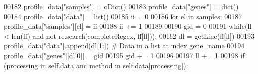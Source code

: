 \begin{DoxyCode}
00182                 profile\_data[\textcolor{stringliteral}{"samples"}] = oDict()
00183                 profile\_data[\textcolor{stringliteral}{"genes"}] = dict()
00184                 profile\_data[\textcolor{stringliteral}{"data"}] = list()
00185                 ii = 0
00186                 \textcolor{keywordflow}{for} el \textcolor{keywordflow}{in} samples:
00187                     profile\_data[\textcolor{stringliteral}{"samples"}][el] = ii
00188                     ii += 1
00189 
00190                 gid = 0
00191                 \textcolor{keywordflow}{while}(ll < len(ff) \textcolor{keywordflow}{and} \textcolor{keywordflow}{not} re.search(completeRegex, ff[ll])):
00192                     dl = getLine(ff[ll])
00193                     profile\_data[\textcolor{stringliteral}{"data"}].append(dl[1:]) \textcolor{comment}{# Data in a list at index
       gene\_name}
00194                     profile\_data[\textcolor{stringliteral}{"genes"}][dl[0]] = gid
00195                     gid += 1
00196 
00197                     ll += 1
00198                 \textcolor{keywordflow}{if} (processing \textcolor{keywordflow}{in} self.\hyperlink{classnavicom_1_1navicom_1_1NaviCom_aa1abff245573ed8406c6bddb4596f093}{data} \textcolor{keywordflow}{and} method \textcolor{keywordflow}{in} self.\hyperlink{classnavicom_1_1navicom_1_1NaviCom_aa1abff245573ed8406c6bddb4596f093}{data}[processing]):
      

\end{DoxyCode}
